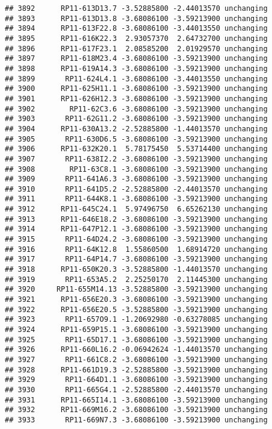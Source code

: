 \documentclass[]{article}
\begin{document}
\begin{verbatim}
## 3892      RP11-613D13.7 -3.52885800 -2.44013570 unchanging
## 3893      RP11-613D13.8 -3.68086100 -3.59213900 unchanging
## 3894      RP11-613F22.8 -3.68086100 -3.44013550 unchanging
## 3895      RP11-616K22.3  2.93057370  2.64732700 unchanging
## 3896      RP11-617F23.1  2.08585200  2.01929570 unchanging
## 3897      RP11-618M23.4 -3.68086100 -3.59213900 unchanging
## 3898      RP11-619A14.3 -3.68086100 -3.59213900 unchanging
## 3899       RP11-624L4.1 -3.68086100 -3.44013550 unchanging
## 3900      RP11-625H11.1 -3.68086100 -3.59213900 unchanging
## 3901      RP11-626H12.3 -3.68086100 -3.59213900 unchanging
## 3902        RP11-62C3.6 -3.68086100 -3.59213900 unchanging
## 3903       RP11-62G11.2 -3.68086100 -3.59213900 unchanging
## 3904      RP11-630A13.2 -2.52885800 -1.44013570 unchanging
## 3905       RP11-630D6.5 -3.68086100 -3.59213900 unchanging
## 3906      RP11-632K20.1  5.78175450  5.53714400 unchanging
## 3907       RP11-638I2.2 -3.68086100 -3.59213900 unchanging
## 3908        RP11-63C8.1 -3.68086100 -3.59213900 unchanging
## 3909       RP11-641A6.3 -3.68086100 -3.59213900 unchanging
## 3910       RP11-641D5.2 -2.52885800 -2.44013570 unchanging
## 3911       RP11-644K8.1 -3.68086100 -3.59213900 unchanging
## 3912      RP11-645C24.1  5.97496750  6.65262130 unchanging
## 3913      RP11-646E18.2 -3.68086100 -3.59213900 unchanging
## 3914      RP11-647P12.1 -3.68086100 -3.59213900 unchanging
## 3915       RP11-64D24.2 -3.68086100 -3.59213900 unchanging
## 3916       RP11-64K12.8  1.55860500  1.68914720 unchanging
## 3917       RP11-64P14.7 -3.68086100 -3.59213900 unchanging
## 3918      RP11-650K20.3 -3.52885800 -1.44013570 unchanging
## 3919       RP11-653A5.2  2.25250170  2.11445300 unchanging
## 3920     RP11-655M14.13 -3.52885800 -3.59213900 unchanging
## 3921      RP11-656E20.3 -3.68086100 -3.59213900 unchanging
## 3922      RP11-656E20.5 -3.52885800 -3.59213900 unchanging
## 3923       RP11-657O9.1 -1.20692980 -0.63278085 unchanging
## 3924      RP11-659P15.1 -3.68086100 -3.59213900 unchanging
## 3925       RP11-65D17.1 -3.68086100 -3.59213900 unchanging
## 3926      RP11-660L16.2 -0.06942624 -1.44013570 unchanging
## 3927       RP11-661C8.2 -3.68086100 -3.59213900 unchanging
## 3928      RP11-661D19.3 -2.52885800 -3.59213900 unchanging
## 3929       RP11-664D1.1 -3.68086100 -3.59213900 unchanging
## 3930       RP11-665G4.1 -2.52885800 -2.44013570 unchanging
## 3931      RP11-665I14.1 -3.68086100 -3.59213900 unchanging
## 3932      RP11-669M16.2 -3.68086100 -3.59213900 unchanging
## 3933       RP11-669N7.3 -3.68086100 -3.59213900 unchanging

\end{verbatim}
\end{document}
